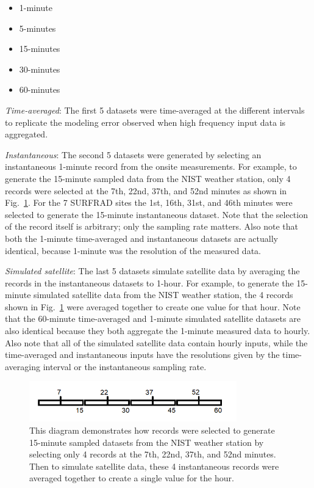 \documentclass[conference]{IEEEtran}
\begin{document}
\begin{itemize}
    \item 1-minute
    \item 5-minutes
    \item 15-minutes
    \item 30-minutes
    \item 60-minutes
\end{itemize}

\emph{Time-averaged}: The first 5 datasets were time-averaged at the different intervals to replicate the modeling error observed when high frequency input data is aggregated.

\emph{Instantaneous}: The second 5 datasets were generated by selecting an instantaneous 1-minute record from the onsite measurements. For example, to generate the 15-minute sampled data from the NIST weather station, only 4 records were selected at the 7th, 22nd, 37th, and 52nd minutes as shown in Fig.~\ref{fig:sampling-diagram}. For the 7 SURFRAD sites the 1st, 16th, 31st, and 46th minutes were selected to generate the 15-minute instantaneous dataset. Note that the selection of the record itself is arbitrary; only the sampling rate matters. Also note that both the 1-minute time-averaged and instantaneous datasets are actually identical, because 1-minute was the resolution of the measured data.

\emph{Simulated satellite}: The last 5 datasets simulate satellite data by averaging the records in the instantaneous datasets to 1-hour. For example, to generate the 15-minute simulated satellite data from the NIST weather station, the 4 records shown in Fig.~\ref{fig:sampling-diagram} were averaged together to create one value for that hour. Note that the 60-minute time-averaged and 1-minute simulated satellite datasets are also identical because they both aggregate the 1-minute measured data to hourly. Also note that all of the simulated satellite data contain hourly inputs, while the time-averaged and instantaneous inputs have the resolutions given by the time-averaging interval or the instantaneous sampling rate.

\begin{figure}[htbp]
\centerline{\includegraphics[width=9cm]{sampling-diagram.png}}
\caption{This diagram demonstrates how records were selected to generate 15-minute sampled datasets from the NIST weather station by selecting only 4 records at the 7th, 22nd, 37th, and 52nd minutes. Then to simulate satellite data, these 4 instantaneous records were averaged together to create a single value for the hour.}
\label{fig:sampling-diagram}
\end{figure}
\end{document}

